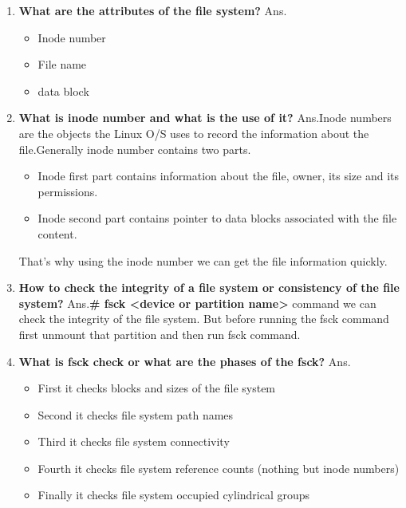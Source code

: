 \begin{enumerate}
\begin{enumerate}
  \item \textbf{What are the attributes of the file system?}
  \newline
  Ans.\begin{itemize}
          \item Inode number
          \item File name
          \item data block 
      \end{itemize}

  \bigskip
  \bigskip

  \item \textbf{What is inode number and what is the use of it?}
  \newline
  Ans.Inode numbers are the objects the Linux O/S uses to record the information about the file.Generally inode number contains two parts.
    \begin{itemize}
      \item Inode first part contains information about the file, owner, its size and its permissions.
      \item Inode second part contains pointer to data blocks associated with the file content.
    \end{itemize}
    \newline
    That's why using the inode number we can get the file information quickly.

  \bigskip
  \bigskip
  
  \item \textbf{How to check the integrity of a file system or consistency of the file system?}
  \newline
   Ans.\textbf{# fsck   <device or partition name>} command we can check the integrity of the file system.
   But before running the fsck command first unmount that partition and then run fsck command.
 
  \bigskip
  \bigskip

  \item \textbf{What is fsck check or what are the phases of the fsck?}
  \newline
  Ans.\begin{itemize}
        \item First it checks blocks and sizes of the file system
        \item  Second it checks file system path names
        \item Third it checks file system connectivity
        \item Fourth it checks file system reference counts (nothing but inode numbers)
        \item  Finally it checks file system occupied cylindrical groups
      \end{itemize}


\end{enumerate}
\end{enumerate}
